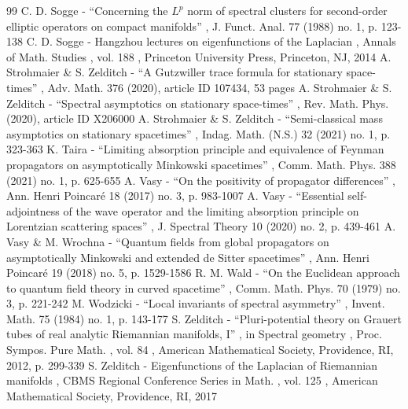 \documentclass[10pt]{amsart}
\theoremstyle{definition}
\begin{document}
\begin{thebibliography}{99}
 C. D. Sogge - “Concerning the $L^p$ norm of spectral clusters for second-order elliptic operators on compact manifolds” , J. Funct. Anal. 77 (1988) no. 1, p. 123-138
 C. D. Sogge - Hangzhou lectures on eigenfunctions of the Laplacian , Annals of Math. Studies , vol. 188 , Princeton University Press, Princeton, NJ, 2014
 A. Strohmaier \& S. Zelditch - “A Gutzwiller trace formula for stationary space-times” , Adv. Math. 376 (2020), article ID 107434, 53 pages
 A. Strohmaier \& S. Zelditch - “Spectral asymptotics on stationary space-times” , Rev. Math. Phys. (2020), article ID X206000
 A. Strohmaier \& S. Zelditch - “Semi-classical mass asymptotics on stationary spacetimes” , Indag. Math. (N.S.) 32 (2021) no. 1, p. 323-363
 K. Taira - “Limiting absorption principle and equivalence of Feynman propagators on asymptotically Minkowski spacetimes” , Comm. Math. Phys. 388 (2021) no. 1, p. 625-655
 A. Vasy - “On the positivity of propagator differences” , Ann. Henri Poincaré 18 (2017) no. 3, p. 983-1007
 A. Vasy - “Essential self-adjointness of the wave operator and the limiting absorption principle on Lorentzian scattering spaces” , J. Spectral Theory 10 (2020) no. 2, p. 439-461
 A. Vasy \& M. Wrochna - “Quantum fields from global propagators on asymptotically Minkowski and extended de Sitter spacetimes” , Ann. Henri Poincaré 19 (2018) no. 5, p. 1529-1586
 R. M. Wald - “On the Euclidean approach to quantum field theory in curved spacetime” , Comm. Math. Phys. 70 (1979) no. 3, p. 221-242
 M. Wodzicki - “Local invariants of spectral asymmetry” , Invent. Math. 75 (1984) no. 1, p. 143-177
 S. Zelditch - “Pluri-potential theory on Grauert tubes of real analytic Riemannian manifolds, I” , in Spectral geometry , Proc. Sympos. Pure Math. , vol. 84 , American Mathematical Society, Providence, RI, 2012, p. 299-339
 S. Zelditch - Eigenfunctions of the Laplacian of Riemannian manifolds , CBMS Regional Conference Series in Math. , vol. 125 , American Mathematical Society, Providence, RI, 2017
\end{thebibliography}
\end{document}
